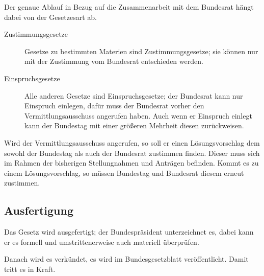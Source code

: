\documentclass{article}
\begin{document}
Der genaue Ablauf in Bezug auf die Zusammenarbeit mit dem Bundesrat hängt dabei von der Gesetzesart ab.
\begin{description}
 \item[Zustimmungsgesetze] Gesetze zu bestimmten Materien sind Zustimmungsgesetze; sie können nur mit der Zustimmung vom Bundesrat entschieden werden.
 \item[Einspruchsgesetze] Alle anderen Gesetze sind Einspruchsgesetze; der Bundesrat kann nur Einspruch einlegen, dafür muss der Bundesrat vorher den Vermittlungsausschuss angerufen haben. Auch wenn er Einspruch einlegt kann der Bundestag mit einer größeren Mehrheit diesen zurückweisen.
\end{description}

Wird der Vermittlungsausschuss angerufen, so soll er einen Lösungsvorschlag dem sowohl der Bundestag als auch der Bundesrat zustimmen finden. Dieser muss sich im Rahmen der bisherigen Stellungnahmen und Anträgen befinden. Kommt es zu einem Lösungsvorschlag, so müssen Bundestag und Bundesrat diesem erneut zustimmen.

\subsection{Ausfertigung}
Das Gesetz wird ausgefertigt; der Bundespräsident unterzeichnet es, dabei kann er es formell und umstrittenerweise auch materiell überprüfen.

Danach wird es verkündet, es wird im Bundesgesetzblatt veröffentlicht. Damit tritt es in Kraft.
\end{document}
